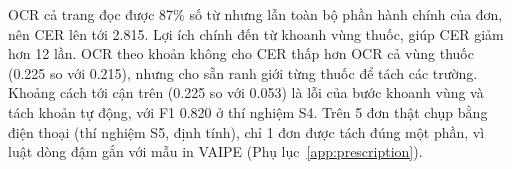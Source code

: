OCR cả trang đọc được 87\% số từ nhưng lẫn toàn bộ phần hành chính của đơn, nên CER lên tới \num{2.815}.
Lợi ích chính đến từ khoanh vùng thuốc, giúp CER giảm hơn 12 lần.
OCR theo khoản không cho CER thấp hơn OCR cả vùng thuốc (\num{0.225} so với \num{0.215}), nhưng cho sẵn ranh giới từng thuốc để tách các trường.
Khoảng cách tới cận trên (\num{0.225} so với \num{0.053}) là lỗi của bước khoanh vùng và tách khoản tự động, với F1 \num{0.820} ở thí nghiệm S4.
Trên 5 đơn thật chụp bằng điện thoại (thí nghiệm S5, định tính), chỉ 1 đơn được tách đúng một phần, vì luật dòng đậm gắn với mẫu in VAIPE (Phụ lục~\ref{app:prescription}).
